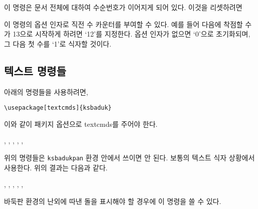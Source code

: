 \documentclass[figtabcapt,a4paper]{oblivoir}
\begin{document}
\begin{boxedverbatim}
\end{boxedverbatim}

\begin{ksbadukpan}[badukpansize=6]
\end{ksbadukpan}

이 명령은 문서 전체에 대하여 수순번호가 이어지게 되어 있다. 이것을 리셋하려면
\begin{boxedverbatim}
\ResetSGFCounter
\end{boxedverbatim}
이 명령의 옵션 인자로 직전 수 카운터를 부여할 수 있다.
예를 들어 다음에 착점할 수가 13으로 시작하게 하려면 `12'를 지정한다. 옵션 인자가 없으면
`0'으로 초기화되며, 그 다음 첫 수를 `1'로 식자할 것이다.

\begin{boxedverbatim}
\ResetSGFCounter[12]
\end{boxedverbatim}

\begin{ksbadukpan}[badukpansize=6][UL]
\KSBadukContinue
\ResetSGFCounter[12]
\end{ksbadukpan}


\subsection{텍스트 명령들}

아래의 명령들을 사용하려면,
\begin{verbatim}
\usepackage[textcmds]{ksbaduk}
\end{verbatim}
이와 같이 패키지 옵션으로 textcmds를 주어야 한다.

\begin{boxedverbatim}
, ,
\WhiteMText, \BlackMText,
\WhiteCText, \BlackCText
\end{boxedverbatim}

위의 명령들은 \texttt{ksbadukpan} 환경 안에서 쓰이면 안 된다. 보통의 텍스트 식자 상황에서 사용한다.
위의 결과는 다음과 같다.

, , \WhiteMText, \BlackMText,
\WhiteCText, \BlackCText

바둑판 환경의 난외에 따낸 돌을 표시해야 할 경우에 이 명령을 쓸 수 있다.
\end{document}

